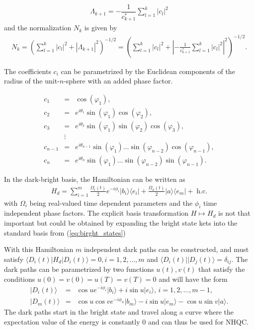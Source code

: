 \documentclass[pra,showpacs,priprent,twocolumn,superscriptaddress]{revtex4-1}
\newcommand{\ket}[1]{|#1\rangle}
\newcommand{\bra}[1]{\langle #1|}
\begin{document}
\begin{eqnarray}
\Lambda_{k+1} = -\dfrac{1}{c_{k+1}^{*}}\sum_{l = 1}^{k}|c_l|^2
\end{eqnarray}
and the normalization $N_{k}$ is given by 
\begin{eqnarray}
N_k =  \left( \sum_{l = 1}^k|c_l|^2  + \left|\Lambda_{k+1}\right|^2 \right)^{-1/2} = \left( \sum_{l = 1}^k|c_l|^2  + \left|-\frac{1}{c_{k+1}^{*}}\sum_{l = 1}^{k} |c_l|^2 \right|^2 \right)^{-1/2}.
\end{eqnarray}

The coefficients $c_i$ can be parametrized by the Euclidean components of the radius of the unit-$n$-sphere with an added phase factor.

\begin{eqnarray}
c_1 &=& \cos(\varphi_1),
\nonumber\\ 
c_2 &=& e^{i\theta_1}\sin(\varphi_1)\cos(\varphi_2),
\nonumber\\ 
c_3 &=& e^{i\theta_2}\sin(\varphi_1)\sin(\varphi_2)\cos(\varphi_3),
\nonumber\\
&\vdots &
\nonumber\\
c_{n-1} &=& e^{i\theta_{n-1}}\sin(\varphi_1)\dots\sin(\varphi_{n-2})\cos(\varphi_{n-1}),
\nonumber\\
c_{n} &=& e^{i\theta_{n}}\sin(\varphi_1)\dots\sin(\varphi_{n-2})\sin(\varphi_{n-1}).
\end{eqnarray}

In the dark-bright basis, the Hamiltonian can be written as
\begin{eqnarray}\label{eq:HamdN}
H_d = \sum_{i = 1}^m \frac{\Omega_i(t)}{2}e^{-i\phi_i}\ket{b_i}\bra{e_i} + \frac{\Omega_a(t)}{2}\ket{a}\bra{e_m} +\;\text{h.c}.
\end{eqnarray}
with $\Omega_i$ being real-valued time dependent parameters and the $\phi_i$ time independent phase factors. The explicit basis transformation $H \mapsto H_d$ is not that important but could be obtained by expanding the bright state kets into the standard basis from (\ref{eq:birght_states})

With this Hamiltonian $m$ independent dark paths can be constructed, and must satisfy $\bra{D_i(t)}H_d\ket{D_i(t)} = 0, i = 1,2,\dots,m$ and $\bra{D_i(t)}\ket{D_j(t)} = \delta_{ij}$. The dark paths can be parametrized by two functions $u(t),v(t)$ that satisfy the conditions $u(0) = v(0) = u(T) = v(T) = 0$ and  will have the form
\begin{eqnarray}
\ket{D_i(t)} &=& \cos u e^{-i\phi_i}\ket{b_i} + i\sin u \ket{e_i},\, i = 1,2,\dots,m-1,
\nonumber\\
\ket{D_m(t)} &=& \cos u \cos v e^{-i\phi_n}\ket{b_m} - i\sin u \ket{e_m} - \cos u \sin v \ket{a}.
\end{eqnarray}
The dark paths start in the bright state and travel along a curve where the expectation value of the energy is constantly $0$ and can thus be used for NHQC.
\end{document}
